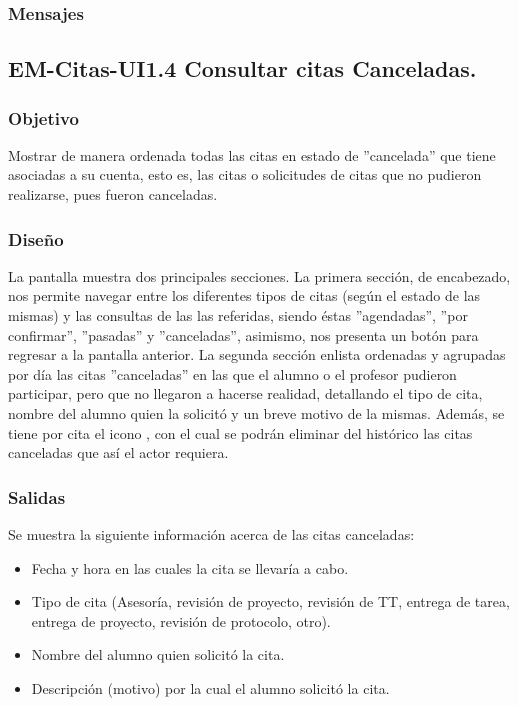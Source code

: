 \subsubsection{Mensajes}
	\begin{Citemize}
		\item {}
	\end{Citemize}


\pagebreak

\subsection{EM-Citas-UI1.4 Consultar citas Canceladas.}

\subsubsection{Objetivo}
	\noindent
	Mostrar de manera ordenada todas las citas en estado de ''cancelada'' que tiene asociadas a su cuenta, esto es, las citas o solicitudes de citas que no pudieron realizarse, pues fueron canceladas.

\subsubsection{Diseño}
	\noindent
	La pantalla muestra dos principales secciones. La primera sección, de encabezado, nos permite navegar entre los diferentes tipos de citas (según el estado de las mismas) y las consultas de las las referidas, siendo éstas ''agendadas'', ''por confirmar'', ''pasadas'' y ''canceladas'', asimismo, nos presenta un botón para regresar a la pantalla anterior.
	\newline
	La segunda sección enlista ordenadas y agrupadas por día las citas ''canceladas'' en las que el alumno o el profesor pudieron participar, pero que no llegaron a hacerse realidad, detallando el tipo de cita, nombre del alumno quien la solicitó y un breve motivo de la mismas. Además, se tiene por cita el icono , con el cual se podrán eliminar del histórico las citas canceladas que así el actor requiera.

\pagebreak
{}

\subsubsection{Salidas}
	\noindent
	Se muestra la siguiente información acerca de las citas canceladas:
		\begin{itemize}
			\item Fecha y hora en las cuales la cita se llevaría a cabo.
			\item Tipo de cita (Asesoría, revisión de proyecto, revisión de TT, entrega de tarea, entrega de proyecto, revisión de protocolo, otro).
			\item Nombre del alumno quien solicitó la cita.
			\item Descripción (motivo) por la cual el alumno solicitó la cita.
		\end{itemize}

